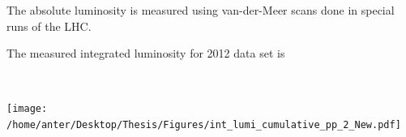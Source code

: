 \documentclass{beamer}
\begin{document}
\begin{frame}
\begin{minipage}[thbp]{0.53\textwidth}
\begin{itemize}
{\item The absolute luminosity is measured using van-der-Meer scans done in special runs of the LHC. 
\vspace{0.5mm}
\item The measured integrated luminosity for 2012 data set is \\}
\item[] 
\end{itemize}
{\tiny {}\\}
\end{minipage}
\begin{minipage}[thbp]{0.33\textwidth}
\vspace{1mm}
\texttt{[image: /home/anter/Desktop/Thesis/Figures/int\_lumi\_cumulative\_pp\_2\_New.pdf]}\\
\end{minipage}\\
\end{frame}

\begin{frame}
\begin{center}
\vspace{13mm}
\textbf{\Large{}}
\end{center}
\end{frame}
\end{document}
